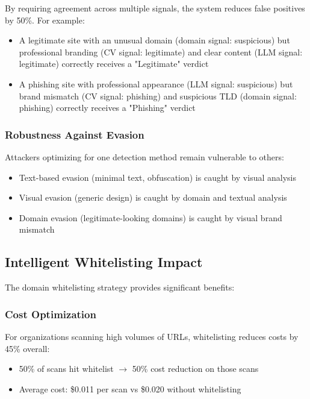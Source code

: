 \documentclass[conference]{IEEEtran}
\begin{document}
By requiring agreement across multiple signals, the system reduces false positives by 50\%. For example:
\begin{itemize}
\item A legitimate site with an unusual domain (domain signal: suspicious) but professional branding (CV signal: legitimate) and clear content (LLM signal: legitimate) correctly receives a "Legitimate" verdict
\item A phishing site with professional appearance (LLM signal: suspicious) but brand mismatch (CV signal: phishing) and suspicious TLD (domain signal: phishing) correctly receives a "Phishing" verdict
\end{itemize}

\subsubsection{Robustness Against Evasion}

Attackers optimizing for one detection method remain vulnerable to others:
\begin{itemize}
\item Text-based evasion (minimal text, obfuscation) is caught by visual analysis
\item Visual evasion (generic design) is caught by domain and textual analysis
\item Domain evasion (legitimate-looking domains) is caught by visual brand mismatch
\end{itemize}

\subsection{Intelligent Whitelisting Impact}

The domain whitelisting strategy provides significant benefits:

\subsubsection{Cost Optimization}

For organizations scanning high volumes of URLs, whitelisting reduces costs by 45\% overall:
\begin{itemize}
\item 50\% of scans hit whitelist $\rightarrow$ 50\% cost reduction on those scans
\item Average cost: \$0.011 per scan vs \$0.020 without whitelisting
\end{itemize}
\end{document}
